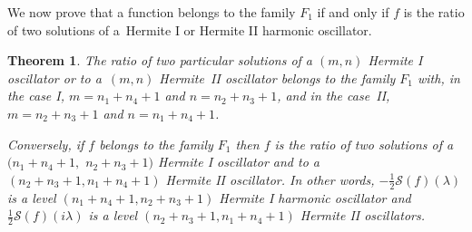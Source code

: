 \documentclass[pdftex]{sigma}
\numberwithin{equation}{section}
\newtheorem{thm}{Theorem}[section]
\newcommand{\la}{\lambda}
\begin{document}
We now prove that a function belongs to the family $F_1$ if and only if $f$ is the ratio of two solutions of a~Hermite I or Hermite II harmonic oscillator.
\begin{thm}\label{thm:nevanlinnahermite12}
	The ratio of two particular solutions of a $(m,n)$ Hermite I oscillator or to a~$(m,n)$ Hermite~II oscillator
	belongs to the family $F_1$ with, in the case I, $m=n_1+n_4+1$ and $n=n_2+n_3+1$, and in the case~II, $m=n_2+n_3+1$ and $n=n_1+n_4+1$.

	Conversely, if $f$ belongs to the family $F_1$ then $f$ is the ratio of
	two solutions of a $(n_1+n_4+1,$ $n_2+n_3+1)$ Hermite I oscillator and to a $(n_2+n_3+1,n_1+n_4+1)$ Hermite II oscillator.
	In other words, $-\frac12 \mathcal{S}(f)(\la)$ is a level $(n_1+n_4+1,n_2+n_3+1)$ Hermite I harmonic oscillator and
	$\frac12 \mathcal{S}(f)(i \la)$ is a level $(n_2+n_3+1,n_1+n_4+1)$ Hermite II oscillators.
\end{thm}
\end{document}
